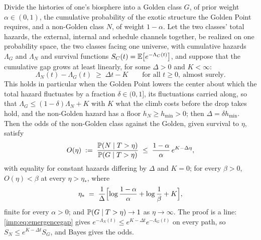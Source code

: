 \begin{theorem}\label{imp:emergence}
Divide the histories of one's biosphere into a Golden class $G$, of
prior weight $\alpha\in(0,1)$, the cumulative probability of the exotic
structure the Golden Point requires, and a non-Golden class $N$, of
weight $1-\alpha$. Let the two classes' total hazards, the external,
internal and schedule channels together, be realized on one probability
space, the two classes facing one universe, with cumulative hazards
$\Lambda_G$ and $\Lambda_N$ and survival functions
$S_C(t)=\mathbb{E}\bigl[e^{-\Lambda_C(t)}\bigr]$, and suppose that the cumulative
gap grows at least linearly, for some $\Delta>0$ and $K<\infty$:
\begin{equation}\label{imp:eq:emergencegap}
\Lambda_N(t)-\Lambda_G(t)\;\ge\;\Delta t-K
\qquad\text{for all }t\ge0,\ \text{almost surely}.
\end{equation}
This holds in particular when the Golden Point lowers the center about
which the total hazard fluctuates by a fraction $\delta\in(0,1]$, its
fluctuations carried along, so that $\Lambda_G\le(1-\delta)\Lambda_N+K$
with $K$ what the climb costs before the drop takes hold, and the
non-Golden hazard has a floor $h_N\ge h_{\min}>0$; then
$\Delta=\delta h_{\min}$. Then the odds of the non-Golden class against
the Golden, given survival to $\eta$, satisfy
\begin{equation}\label{imp:eq:emergenceodds}
O(\eta)\;:=\;\frac{\mathbb{P}(N\mid T>\eta)}{\mathbb{P}(G\mid T>\eta)}
\;\le\;\frac{1-\alpha}{\alpha}\,e^{K-\Delta\eta},
\end{equation}
with equality for constant hazards differing by $\Delta$ and $K=0$; for
every $\beta>0$, $O(\eta)<\beta$ at every $\eta>\eta_\ast$, where
\begin{equation}\label{imp:eq:emergencehorizon}
\eta_\ast\;=\;\frac{1}{\Delta}\Bigl[\log\frac{1-\alpha}{\alpha}
+\log\frac{1}{\beta}+K\Bigr],
\end{equation}
finite for every $\alpha>0$; and $\mathbb{P}(G\mid T>\eta)\to1$ as
$\eta\to\infty$. The proof is a line: \eqref{imp:eq:emergencegap} gives
$e^{-\Lambda_N(t)}\le e^{K-\Delta t}e^{-\Lambda_G(t)}$ on every path, so
$S_N\le e^{K-\Delta t}S_G$, and Bayes gives the odds.
\end{theorem}

